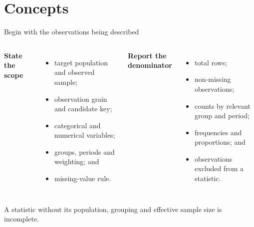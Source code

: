 \documentclass[10pt,aspectratio=169]{beamer}
\begin{document}
\section{Concepts}


\begin{frame}{Begin with the observations being described}

\small

\begin{columns}[T]


\textbf{State the scope}

\begin{itemize}
  \item target population and observed sample;
  \item observation grain and candidate key;
  \item categorical and numerical variables;
  \item groups, periods and weighting; and
  \item missing-value rule.
\end{itemize}


\textbf{Report the denominator}

\begin{itemize}
  \item total rows;
  \item non-missing observations;
  \item counts by relevant group and period;
  \item frequencies and proportions; and
  \item observations excluded from a statistic.
\end{itemize}

\end{columns}

\vspace{0.35cm}

\centering
\textcolor{ukudlaRed}{A statistic without its population, grouping and effective sample size is incomplete.}

\end{frame}
\end{document}
